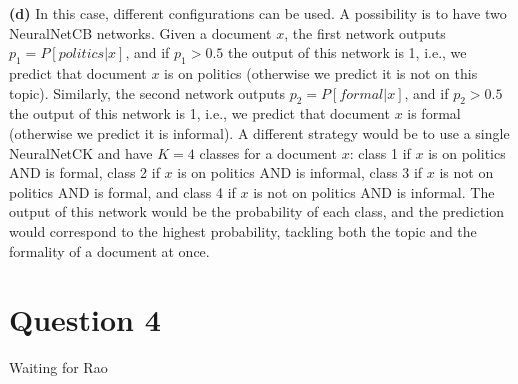 \documentclass[leqno]{article}
\begin{document}
\noindent \textbf{(d)} In this case, different configurations can be used. A possibility is to have two NeuralNetCB networks. Given a document $x$, the first 
network outputs $p_1 = P[politics|x]$, and if $p_1 > 0.5$ the output of this network is 1, i.e., we predict that document $x$ is on politics (otherwise we predict it is not 
on this topic). Similarly, the 
second network outputs $p_2 = P[formal|x]$, and if $p_2 > 0.5$ the output of this network is 1, i.e., we predict that document $x$ is formal (otherwise we predict it is 
informal). A different strategy would be to use a single NeuralNetCK and have $K = 4$ classes for a document $x$: class 1 if $x$ is on politics AND is formal, 
class 2 if $x$ is on politics AND is informal, class 3 if $x$ is not on politics AND is formal, and class 4 if $x$ is not on politics AND is informal. The output of this 
network would be the probability of each class, and the prediction would correspond to the highest probability, tackling both the topic and the formality of a document at 
once. 

\hfill

\section*{Question 4} Waiting for Rao
\end{document}
